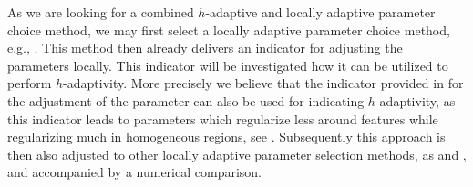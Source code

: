 \documentclass[enabledeprecatedfontcommands,cleardoublepage=empty,headsepline,twoside,11pt,DIV=15,BCOR=12mm,final]{scrartcl}
\begin{document}
As we are looking for a combined $h$-adaptive and locally adaptive parameter choice method, we may first select a locally adaptive parameter choice method, e.g., \cite{DoHiRi:11}. This method then already delivers an indicator for adjusting the parameters locally. This indicator will be investigated how it can be utilized to perform $h$-adaptivity. More precisely we believe that the indicator provided in \cite{DoHiRi:11} for the adjustment of the parameter can also be used for indicating $h$-adaptivity, as this indicator leads to parameters which regularize less around features while regularizing much in homogeneous regions, see \cite{DoHiRi:11}. Subsequently this approach is then also adjusted to other locally adaptive parameter selection methods, as  and \cite{CaLaPrSg:19}, and accompanied by a numerical comparison.

\end{document}
